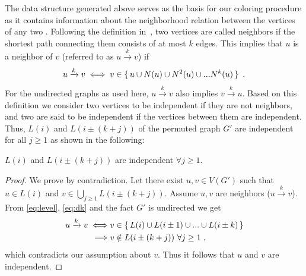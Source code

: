 The data structure generated above serves as the basis for our \DK coloring
procedure as it contains information about the neighborhood relation
between the vertices of any two \levels. Following the definition
in~\cite{dist_k_def}, two vertices are called \DK neighbors if the
shortest path connecting them consists of at most $k$ edges.
This implies that $u$ is a \DK neighbor of $v$ (referred to as
$u\xrightarrow{k}v$) if
\begin{equation}\label{eq:dk}
  u\xrightarrow{k}v  \iff  v \in \set{ u \cup N(u) \cup N^2(u) \cup ... N^k(u) }\eos
\end{equation}
For the undirected graphs as used here, $u\xrightarrow{k}v$
also implies $v\xrightarrow{k}u$. Based on this definition we consider
two vertices to be \DK independent if they are not \DK
neighbors, and two \levels are said to be \DK independent if the vertices between them are \DK independent. Thus, \levels $L(i)$ and $L(i\pm(k+j))$ of the permuted
graph $G'$ are \DK independent for all $j\geq1$ as shown in the
following:
\begin{corollary}\label{corollary_dk}
$L(i)$ and $L(i\pm(k+j))$ are \DK independent $\forall j\geq1$. 
\end{corollary}
\begin{proof}
  We prove by contradiction. Let there exist $u,v \in V(G')$ such that
  $u \in L(i)$ and $v \in \bigcup\limits_{j\geq 1}L(i \pm (k+j))$. Assume $u,v$
  are \DK neighbors ($u\xrightarrow{k}v$). From \cref{eq:level},
  \cref{eq:dk} and the fact $G'$ is undirected we get
\begin{align*}
  u\xrightarrow{k}v \iff & v \in \set{L(i) \cup L(i \pm 1) \cup ... \cup L(i \pm k)} \\
  \implies & v \notin L(i \pm (k+j)) \text{  } \forall j \geq 1~,
\end{align*}
which contradicts our assumption about $v$\@.
Thus it follows that $u$ and $v$ are \DK independent.
\end{proof}

